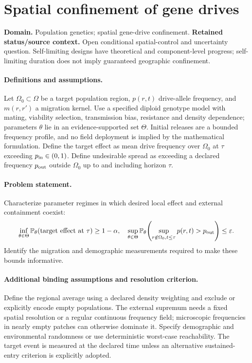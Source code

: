 \documentclass[11pt]{article}
\begin{document}
\section*{Spatial confinement of gene drives}
\label{prob:273}
\label{rank:112}
\par\smallskip

\noindent\textbf{Domain.} Population genetics; spatial gene-drive confinement. \quad \textbf{Retained status/source context.} Open conditional spatial-control and uncertainty question. Self-limiting designs have theoretical and component-level progress; self-limiting duration does not imply guaranteed geographic confinement.

\paragraph{Definitions and assumptions.} Let $\Omega_0\subset\Omega$ be a target population region, $p(r,t)$ drive-allele frequency, and $m(r,r')$ a migration kernel. Use a specified diploid genotype model with mating, viability selection, transmission bias, resistance and density dependence; parameters $\theta$ lie in an evidence-supported set $\Theta$. Initial releases are a bounded frequency profile, and no field deployment is implied by the mathematical formulation. Define the target effect as mean drive frequency over $\Omega_0$ at $\tau$ exceeding $p_{\rm in}\in(0,1)$. Define undesirable spread as exceeding a declared frequency $p_{\rm out}$ outside $\Omega_0$ up to and including horizon $\tau$.

\paragraph{Problem statement.} Characterize parameter regimes in which desired local effect and external containment coexist:
\[
\inf_{\theta\in\Theta}\mathbb{P}_\theta(\text{target effect at }\tau)\geq1-\alpha,
\quad
\sup_{\theta\in\Theta}\mathbb{P}_\theta\!\left(\sup_{r\notin\Omega_0,t\leq\tau}p(r,t)>p_{\rm out}\right)\leq\varepsilon.
\]
Identify the migration and demographic measurements required to make these bounds informative.

\paragraph{Additional binding assumptions and resolution criterion.} Define the regional average using a declared density weighting and exclude or explicitly encode empty populations. The external supremum needs a fixed spatial resolution or a regular continuous frequency field; microscopic frequencies in nearly empty patches can otherwise dominate it. Specify demographic and environmental randomness or use deterministic worst-case reachability. The target event is measured at the declared time unless an alternative sustained-entry criterion is explicitly adopted.
\end{document}
